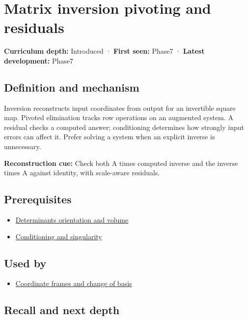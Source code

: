 \hypertarget{appendix-48d2e66378ab}{}\label{referencestart:appendix-48d2e66378ab}
\section{Matrix inversion pivoting and residuals}\label{appendix-48d2e66378ab-matrix-inversion-pivoting-and-residuals}

\textbf{Curriculum depth:} Introduced · \textbf{First seen:} Phase7 · \textbf{Latest development:} Phase7

\subsection{Definition and mechanism}\label{appendix-48d2e66378ab-definition-and-mechanism}

Inversion reconstructs input coordinates from output for an invertible square map. Pivoted elimination tracks row operations on an augmented system. A residual checks a computed answer; conditioning determines how strongly input errors can affect it. Prefer solving a system when an explicit inverse is unnecessary.

\textbf{Reconstruction cue:} Check both A times computed inverse and the inverse times A against identity, with scale-aware residuals.

\subsection{Prerequisites}\label{appendix-48d2e66378ab-prerequisites}

\begin{itemize}
\tightlist
\item
  \hyperref[appendix-da478be01d02]{Determinants orientation and volume}
\item
  \hyperref[appendix-8f6a01f284a7]{Conditioning and singularity}
\end{itemize}

\subsection{Used by}\label{appendix-48d2e66378ab-used-by}

\begin{itemize}
\tightlist
\item
  \hyperref[appendix-1bae9457dbc3]{Coordinate frames and change of basis}
\end{itemize}

\subsection{Recall and next depth}\label{appendix-48d2e66378ab-recall-and-next-depth}

